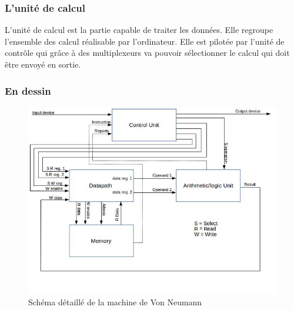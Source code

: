 \documentclass[10pt,a4paper,twoside]{article}
\begin{document}
\subsubsection{L'unité de calcul}
L'unité de calcul est la partie capable de traiter les données. Elle regroupe l'ensemble des calcul réalisable par l'ordinateur. Elle est pilotée par l'unité de contrôle qui grâce à des multiplexeurs va pouvoir sélectionner le calcul qui doit être envoyé en sortie.

\newpage
\subsubsection{En dessin}
\begin{figure}[hbtp]
\caption{Schéma détaillé de la machine de Von Neumann}
\centering
\includegraphics[scale=0.65]{MVN_detail.jpg} 
\end{figure}
\FloatBarrier
\end{document}
